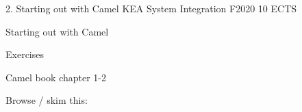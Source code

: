 \documentclass[Screen16to9,17pt]{foils}
\begin{document}
\mytitlepage
{2. Starting out with Camel}
{KEA System Integration F2020 10 ECTS}


\begin{list2}
\item Starting out with Camel
\item
\item
\end{list2}

Exercises
\begin{list2}
\item
\item
\end{list2}




\begin{list1}
\item Camel book chapter 1-2

\item Browse / skim this:\\

\end{list1}




\slidenext
\end{document}
